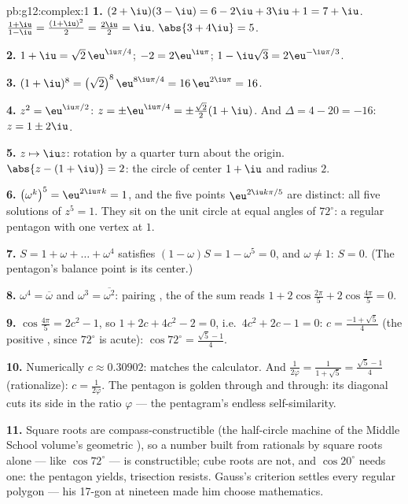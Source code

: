 \begin{solution}{pb:g12:complex:1}
\textbf{1.} $(2 + \iu)(3 - \iu) = 6 - 2\iu + 3\iu + 1 =
7 + \iu$. \quad $\frac{1 + \iu}{1 - \iu} =
\frac{(1 + \iu)^2}{2} = \frac{2\iu}{2} = \iu$. \quad
$\abs{3 + 4\iu} = 5$.

\textbf{2.} $1 + \iu = \sqrt2\,\eu^{\iu\pi/4}$;
$-2 = 2\eu^{\iu\pi}$;
$1 - \iu\sqrt3 = 2\eu^{-\iu\pi/3}$.

\textbf{3.} $(1 + \iu)^8 = \left(\sqrt2\right)^8
\eu^{8\iu\pi/4} = 16\,\eu^{2\iu\pi} = 16$.

\textbf{4.} $z^2 = \eu^{\iu\pi/2}$:
$z = \pm\eu^{\iu\pi/4} = \pm\frac{\sqrt2}{2}(1 + \iu)$. And
$\Delta = 4 - 20 = -16$: $z = 1 \pm 2\iu$.

\textbf{5.} $z \mapsto \iu z$: rotation by a quarter turn
about the origin. $\abs{z - (1 + \iu)} = 2$: the circle of
center $1 + \iu$ and radius $2$.

\textbf{6.} $\left(\omega^k\right)^5 = \eu^{2\iu\pi k} = 1$,
and the five points $\eu^{2\iu k\pi/5}$ are distinct: all five
solutions of $z^5 = 1$. They sit on the unit circle at equal
angles of $72^\circ$: a regular pentagon with one vertex at
$1$.

\textbf{7.} $S = 1 + \omega + \dots + \omega^4$ satisfies
$(1 - \omega)S = 1 - \omega^5 = 0$, and $\omega \neq 1$:
$S = 0$. (The pentagon's balance point is its center.)

\textbf{8.} $\omega^4 = \overline\omega$ and
$\omega^3 = \overline{\omega^2}$: pairing , the  of the sum reads
$1 + 2\cos\frac{2\pi}{5} + 2\cos\frac{4\pi}{5} = 0$.

\textbf{9.} $\cos\frac{4\pi}{5} = 2c^2 - 1$, so
$1 + 2c + 4c^2 - 2 = 0$, i.e.\ $4c^2 + 2c - 1 = 0$:
$c = \frac{-1 + \sqrt5}{4}$ (the positive , since
$72^\circ$ is acute):
$\cos 72^\circ = \frac{\sqrt5 - 1}{4}$.

\textbf{10.} Numerically $c \approx 0.30902$: matches the
calculator. And $\frac{1}{2\varphi} = \frac{1}{1 + \sqrt5} =
\frac{\sqrt5 - 1}{4}$ (rationalize): $c = \frac{1}{2\varphi}$.
The pentagon is golden through and through: its diagonal cuts
its side in the ratio $\varphi$ --- the pentagram's endless
self-similarity.

\textbf{11.} Square roots are compass-constructible (the
half-circle machine of the Middle School volume's geometric
), so a number built from rationals by square roots alone
--- like $\cos 72^\circ$ --- is constructible; cube roots are
not, and $\cos 20^\circ$ needs one: the pentagon yields,
trisection resists. Gauss's criterion settles every regular
polygon --- his 17-gon at nineteen made him choose
mathematics.


\end{solution}
